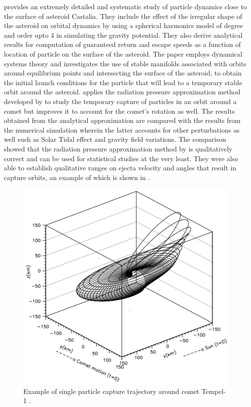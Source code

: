 %
\newline\newline
%
\cite{scheeres1996orbits} provides an extremely detailed and systematic study of particle dynamics close to the surface of asteroid Castalia. They include the effect of the irregular shape of the asteroid on orbital dynamics by using a spherical harmonics model of degree and order upto 4 in simulating the gravity potential. They also derive analytical results for computation of guaranteed return and escape speeds as a function of location of particle on the surface of the asteroid. The paper employs dynamical systems theory and investigates the use of stable manifolds associated with orbits around equilibrium points and intersecting the surface of the asteroid, to obtain the initial launch conditions for the particle that will lead to a temporary stable orbit around the asteroid. \cite{scheeres2000ejecta} applies the radiation pressure approximation method developed by \cite{richter1995stability} to study the temporary capture of particles in an orbit around a comet but improves it to account for the comet's rotation as well. The results obtained from the analytical approximation are compared with the results from the numerical simulation wherein the latter accounts for other perturbations as well such as Solar Tidal effect and gravity field variations. The comparison showed that the radiation pressure approximation method by \cite{richter1995stability} is qualitatively correct and can be used for statistical studies at the very least. They were also able to establish qualitative ranges on ejecta velocity and angles that result in capture orbits, an example of which is shown in .
\begin{figure}[htb]
\centering
\captionsetup{justification=centering}
\includegraphics[width=\linewidth, height=0.4\textheight, keepaspectratio=true]{capture_orbit_tempel1_scheeres.pdf}
\caption{Example of single particle capture trajectory around comet Tempel-1 \parencite{scheeres2000ejecta}.}
\label{fig:comet_temporary_capture_example}
\end{figure}
